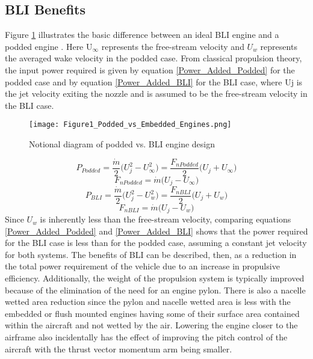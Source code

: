 \subsection{BLI Benefits}
\indent Figure \ref{Podded_vs_Embedded_Engines} illustrates the basic difference between an ideal BLI engine and a podded engine \cite{PlasThesis}.  Here U$_\infty$ represents the free-stream velocity and $U_w$ represents the averaged wake velocity in the podded case. From classical propulsion theory, the input power required is given by equation \ref{Power_Added_Podded} for the podded case and by equation \ref{Power_Added_BLI} for the BLI case, where Uj is the jet velocity exiting the nozzle and is assumed to be the free-stream velocity in the BLI case.
    \begin{figure}
    \centering
    \texttt{[image: Figure1\_Podded\_vs\_Embedded\_Engines.png]}
    \caption{Notional diagram of podded vs. BLI engine design}
    \label{Podded_vs_Embedded_Engines}
    \end{figure}
\begin{equation}P_{Podded}= \frac{\dot{m}}{2}\big(U_j^2-U_\infty^2\big) = \frac{F_{n Podded}}{2}\big(U_j+U_\infty\big)\label{Power_Added_Podded}\end{equation}
\begin{equation}F_{n Podded}= \dot{m}\big(U_j-U_\infty\big) \label{Net_Thrust_Podded}\end{equation}
\begin{equation}P_{BLI}= \frac{\dot{m}}{2}\big(U_j^2-U_w^2\big) = \frac{F_{n BLI}}{2}\big(U_j +U_w\big)\label{Power_Added_BLI}\end{equation}
\begin{equation}F_{n BLI}= \dot{m}\big(U_j-U_w\big) \label{Net_Thrust_BLI}\end{equation}
Since $U_w$ is inherently less than the free-stream velocity, comparing equations \ref{Power_Added_Podded} and \ref{Power_Added_BLI} shows that the power required for the BLI case is less than for the podded case, assuming a constant jet velocity for both systems.  The benefits of BLI can be described, then, as a reduction in the total power requirement of the vehicle due to an increase in propulsive efficiency.  Additionally, the weight of the propulsion system is typically improved because of the elimination of the need for an engine pylon. There is also a nacelle wetted area reduction since the pylon and nacelle wetted area is less with the embedded or flush mounted engines having some of their surface area contained within the aircraft and not wetted by the air.  Lowering the engine closer to the airframe also incidentally has the effect of improving the pitch control of the aircraft with the thrust vector momentum arm being smaller.  

